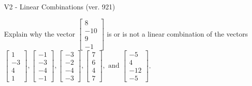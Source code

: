 \begin{exercise}
  \begin{exerciseTitle}V2 - Linear Combinations (ver. 921)\end{exerciseTitle}
  \begin{exerciseStatement}
    Explain why the vector \(\left[\begin{array}{c}
8 \\
-10 \\
9 \\
-1
\end{array}\right]\)  is or is not a linear 
	combination of the vectors \(\left[\begin{array}{c}
1 \\
-3 \\
4 \\
1
\end{array}\right] , \left[\begin{array}{c}
-1 \\
-3 \\
-4 \\
-1
\end{array}\right] , \left[\begin{array}{c}
-3 \\
-2 \\
-4 \\
-3
\end{array}\right] , \left[\begin{array}{c}
7 \\
6 \\
4 \\
7
\end{array}\right] , \text{ and } \left[\begin{array}{c}
-5 \\
4 \\
-12 \\
-5
\end{array}\right]\).
	



\end{exerciseStatement}
\end{exercise}
